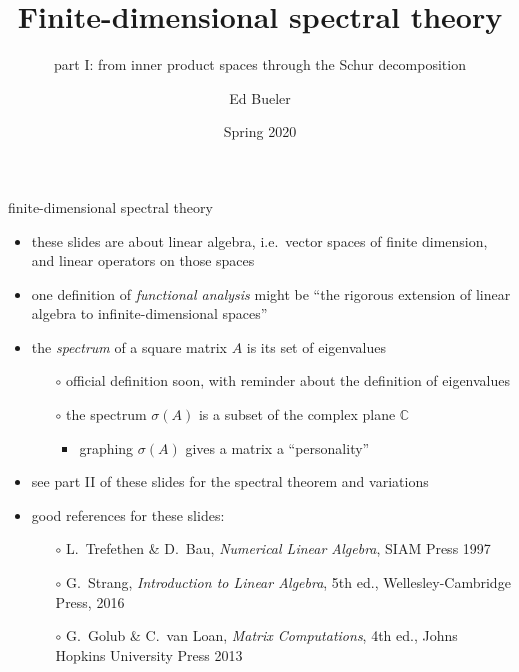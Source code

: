 \documentclass[10pt,hyperref]{beamer}
\title{Finite-dimensional spectral theory}
\subtitle{part I: from inner product spaces through the Schur decomposition}
\author{Ed Bueler}
\institute[MATH 617]{MATH 617 Functional Analysis}
\date{Spring 2020}
\newcommand{\CC}{\mathbb{C}}
\begin{document}
\beamertemplatenavigationsymbolsempty

\begin{frame}
  \maketitle
\end{frame}


\begin{frame}{finite-dimensional spectral theory}

\begin{itemize}
\item these slides are about linear algebra, i.e.~vector spaces of finite dimension, and linear operators on those spaces
\item one definition of \emph{functional analysis} might be ``the rigorous extension of linear algebra to infinite-dimensional spaces''
\item the \emph{spectrum} of a square matrix $A$ is its set of eigenvalues
    \begin{itemize}
    \item[$\circ$] official definition soon, with reminder about the definition of eigenvalues
    \item[$\circ$] the spectrum $\sigma(A)$ is a subset of the complex plane $\CC$
        \begin{itemize}
        \item graphing $\sigma(A)$ gives a matrix a ``personality''
        \end{itemize}
    \end{itemize}
\item see part II of these slides for the spectral theorem and variations
\item good references for these slides:
    \begin{itemize}
    \item[$\circ$] L.~Trefethen \& D.~Bau, \emph{Numerical Linear Algebra}, SIAM Press 1997
    \item[$\circ$] G.~Strang, \emph{Introduction to Linear Algebra}, 5th ed., Wellesley-Cambridge Press, 2016
    \item[$\circ$] G.~Golub \& C.~van Loan, \emph{Matrix Computations}, 4th ed., Johns Hopkins University Press 2013
    \end{itemize}

\end{itemize}
\end{frame}
\end{document}
